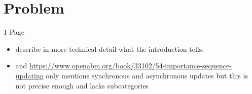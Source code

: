 \section{Problem}
1 Page

\begin{itemize}
	\item describe in more technical detail what the introduction tells.
	\item \cite{huberman_evolutionary_1993} and \url{https://www.openabm.org/book/33102/54-importance-sequence-updating} only mentions synchronous and asynchronous updates but this is not precise enough and lacks subcategories
\end{itemize}